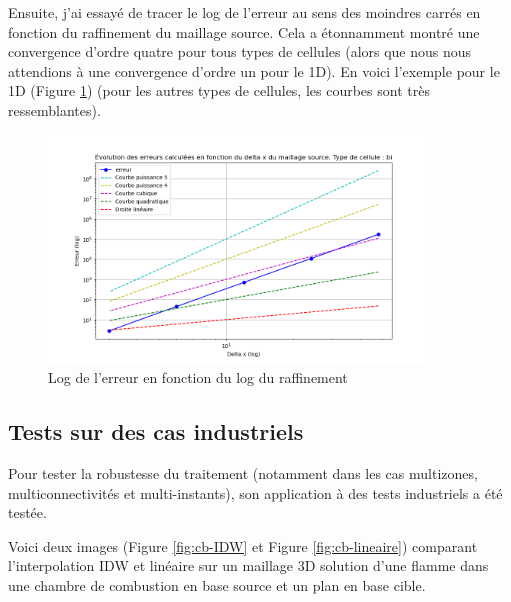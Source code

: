Ensuite, j'ai essayé de tracer le log de l'erreur au sens des moindres carrés en fonction du raffinement du maillage source. Cela a étonnamment montré une convergence d'ordre quatre pour tous types de cellules (alors que nous nous attendions à une convergence d'ordre un pour le 1D). En voici l'exemple pour le 1D (Figure \ref{fig:bi}) (pour les autres types de cellules, les courbes sont très ressemblantes).
\begin{figure}[H]
    \centering
    \includegraphics[width=0.90\textwidth]{images/err_puissance2_bi.png}
    \caption{Log de l'erreur en fonction du log du raffinement}
    \label{fig:bi}
\end{figure}


\subsection{Tests sur des cas industriels}

Pour tester la robustesse du traitement (notamment dans les cas multizones, multiconnectivités et multi-instants), son application à des tests industriels a été testée.

Voici deux images (Figure \ref{fig:cb-IDW} et Figure \ref{fig:cb-lineaire}) comparant l'interpolation IDW et linéaire sur un maillage 3D solution d'une flamme dans une chambre de combustion en base source et un plan en base cible.

